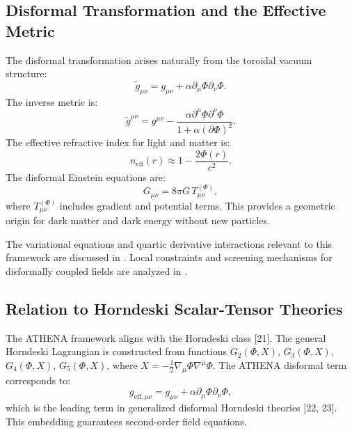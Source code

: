 \documentclass[12pt, a4paper]{article}
\begin{document}
\subsection{Disformal Transformation and the Effective Metric}
\label{sec:disformal}
The disformal transformation arises naturally from the toroidal vacuum structure:
\begin{equation}
\tilde{g}_{\mu\nu} = g_{\mu\nu} + \alpha \partial_\mu \Phi \partial_\nu \Phi.
\label{eq:disformal_metric}
\end{equation}
The inverse metric is:
\begin{equation}
\tilde{g}^{\mu\nu} = g^{\mu\nu} - \frac{\alpha \partial^\mu \Phi \partial^\nu \Phi}{1 + \alpha (\partial\Phi)^2}.
\label{eq:disformal_inverse}
\end{equation}
The effective refractive index for light and matter is:
\begin{equation}
n_{\mathrm{eff}}(r) \approx 1 - \frac{2\Phi(r)}{c^2}.
\label{eq:refractive_index}
\end{equation}
The disformal Einstein equations are:
\begin{equation}
G_{\mu\nu} = 8\pi G \, T_{\mu\nu}^{(\Phi)},
\label{eq:disformal_einstein}
\end{equation}
where $T_{\mu\nu}^{(\Phi)}$ includes gradient and potential terms. This provides a geometric origin for dark matter and dark energy without new particles.

The variational equations and quartic derivative interactions relevant to this framework are discussed in \cite{zumalacarregui2012, zumalacarregui2015}. Local constraints and screening mechanisms for disformally coupled fields are analyzed in \cite{zumalacarregui2012_screening}.

\subsection{Relation to Horndeski Scalar-Tensor Theories}
\label{sec:horndeski}
The ATHENA framework aligns with the Horndeski class [21]. The general Horndeski Lagrangian is constructed from functions $G_2(\Phi,X)$, $G_3(\Phi,X)$, $G_4(\Phi,X)$, $G_5(\Phi,X)$, where $X = -\frac{1}{2}\nabla_\mu \Phi \nabla^\mu \Phi$. The ATHENA disformal term corresponds to:
\begin{equation}
g_{\mathrm{eff},\mu\nu} = g_{\mu\nu} + \alpha \partial_\mu \Phi \partial_\nu \Phi,
\label{eq:horndeski_embedding}
\end{equation}
which is the leading term in generalized disformal Horndeski theories [22, 23]. This embedding guarantees second-order field equations.
\end{document}
